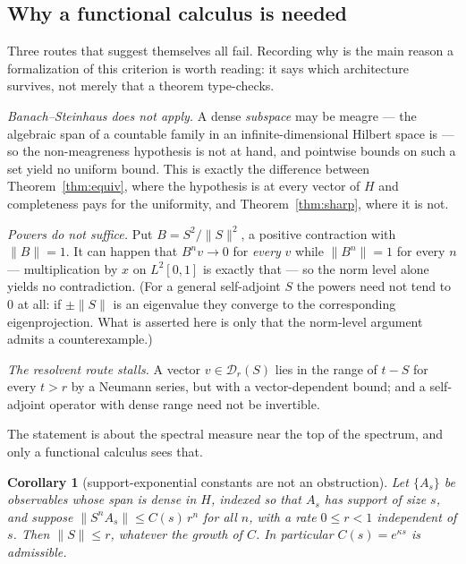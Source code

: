 \documentclass[11pt]{article}
\newtheorem{corollary}[theorem]{Corollary}
\theoremstyle{definition}
\begin{document}
\subsection*{Why a functional calculus is needed}
\label{rem:notelem}

Three routes that suggest themselves all fail.  Recording why is the main
reason a formalization of this criterion is worth reading: it says which
architecture survives, not merely that a theorem type-checks.

\smallskip\noindent\emph{Banach--Steinhaus does not apply.}  A dense
\emph{subspace} may be meagre --- the algebraic span of a countable
family in an infinite-dimensional Hilbert space is --- so
the non-meagreness hypothesis is not at hand, and pointwise bounds on such
a set yield no uniform bound.  This is exactly the difference between
Theorem~\ref{thm:equiv}, where the hypothesis is at every vector of $H$
and completeness pays for the uniformity, and Theorem~\ref{thm:sharp},
where it is not.

\smallskip\noindent\emph{Powers do not suffice.}  Put
$B = S^2/\|S\|^2$, a positive contraction with $\|B\| = 1$.  It can happen
that $B^n v \to 0$ for \emph{every} $v$ while $\|B^n\| = 1$ for every $n$
--- multiplication by $x$ on $L^2[0,1]$ is exactly that --- so the norm
level alone yields no contradiction.  (For a general self-adjoint $S$ the
powers need not tend to $0$ at all: if $\pm\|S\|$ is an eigenvalue they
converge to the corresponding eigenprojection.  What is asserted here is
only that the norm-level argument admits a counterexample.)

\smallskip\noindent\emph{The resolvent route stalls.}  A vector
$v \in \mathcal{D}_r(S)$ lies in the range of $t - S$ for every $t > r$ by
a Neumann series, but with a vector-dependent bound; and a self-adjoint
operator with dense range need not be invertible.

\smallskip\noindent The statement is about the spectral measure near the
top of the spectrum, and only a functional calculus sees that.

\begin{corollary}[support-exponential constants are not an obstruction]
\label{cor:noobstruction}
Let $\{A_s\}$ be observables whose span is dense in $H$, indexed so that
$A_s$ has support of size $s$, and suppose $\|S^n A_s\| \le
C(s)\,r^n$ for all $n$, with a rate $0 \le r < 1$ independent of $s$.  Then
$\|S\| \le r$, whatever the growth of $C$.  In particular $C(s) =
e^{\kappa s}$ is admissible.
\end{corollary}
\end{document}
